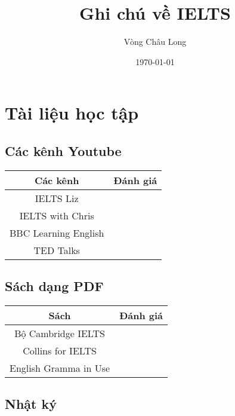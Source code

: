 \documentclass{report}
\title{Ghi chú về IELTS}
\author{Vòng Châu Long}
\date{\today}
\begin{document}
	\maketitle
	
	\chapter{Tài liệu học tập}
	\section{Các kênh Youtube}
	\begin{tabular}{cc}
		\toprule
		Các kênh & Đánh giá \\ 
		\midrule
		IELTS Liz & \\
		\midrule
		IELTS with Chris & \\
		\midrule 
		BBC Learning English & \\
		\midrule
		TED Talks & \\
		\bottomrule
	\end{tabular} 
	\section{Sách dạng PDF}
	\begin{tabular}{cc}
		\toprule
		Sách & Đánh giá \\ 
		\midrule
		Bộ Cambridge IELTS & \\
		\midrule
		Collins for IELTS & \\
		\midrule 
		English Gramma in Use & \\
		\bottomrule
	\end{tabular} 
	\section{Nhật ký}
\end{document}
